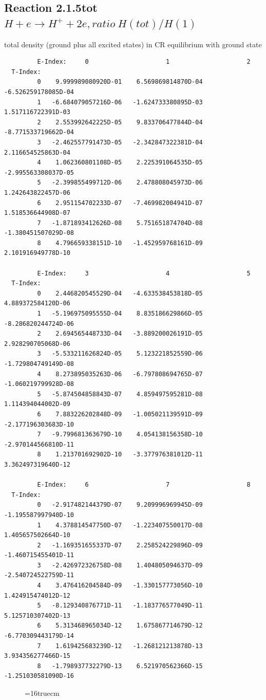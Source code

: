 \documentclass[12pt,dvips]{article}
\begin{document}
\newpage
\subsection{
Reaction 2.1.5tot $ H + e \rightarrow H^+ + 2e, ratio ~ H(tot)/H(1)$
}

total density (ground plus all excited states) in CR equilibrium with ground state

\begin{small}\begin{verbatim}
         E-Index:     0                     1                     2
  T-Index:
         0    9.999989080920D-01    6.569869814870D-04   -6.526259178085D-04
         1   -6.684079057216D-06   -1.624733380895D-03    1.517116722391D-03
         2    2.553992642225D-05    9.833706477844D-04   -8.771533719662D-04
         3   -2.462557791473D-05   -2.342847322381D-04    2.116654525863D-04
         4    1.062360801108D-05    2.225391064535D-05   -2.995563308037D-05
         5   -2.399855499712D-06    2.478808045973D-06    1.242643822457D-06
         6    2.951154702233D-07   -7.469982004941D-07    1.518536644908D-07
         7   -1.871893412626D-08    5.751651874704D-08   -1.380451507029D-08
         8    4.796659338151D-10   -1.452959768161D-09    2.101916949778D-10

         E-Index:     3                     4                     5
  T-Index:
         0    2.446820545529D-04   -4.633538453818D-05    4.889372584120D-06
         1   -5.196975095555D-04    8.835186629866D-05   -8.286820244724D-06
         2    2.694565448733D-04   -3.889200026191D-05    2.928290705068D-06
         3   -5.533211626824D-05    5.123221852559D-06   -1.729804749149D-08
         4    8.273895035263D-06   -6.797808694765D-07   -1.060219799928D-08
         5   -5.874504858843D-07    4.859497595281D-08    1.114394044002D-09
         6    7.883226202848D-09   -1.005021139591D-09   -2.177196303683D-10
         7   -9.799681363679D-10    4.054138156358D-10   -2.970144566810D-11
         8    1.213701692902D-10   -3.377976381012D-11    3.362497319640D-12

         E-Index:     6                     7                     8
  T-Index:
         0   -2.917482144379D-07    9.209996969945D-09   -1.195587997940D-10
         1    4.378814547750D-07   -1.223407550017D-08    1.405657502664D-10
         2   -1.169351655337D-07    2.258524229896D-09   -1.460715455401D-11
         3   -2.426972326758D-08    1.404805094637D-09   -2.540724522759D-11
         4    3.476416204584D-09   -1.330157773056D-10    1.424915474012D-12
         5   -8.129340876771D-11   -1.183776577049D-11    5.125710307402D-13
         6    5.313468965034D-12    1.675867714679D-12   -6.770309443179D-14
         7    1.619425683239D-12   -1.268121213878D-13    3.934356277466D-15
         8   -1.798937732279D-13    6.521970562366D-15   -1.251030581090D-16

\end{verbatim}\end{small}
\begin{figure} \label{2.1.5tot}
\epsfxsize=16truecm
\end{figure}
\end{document}
